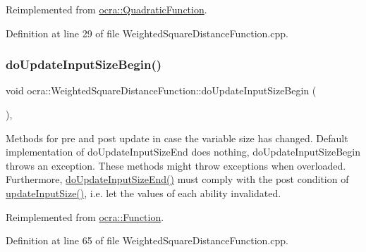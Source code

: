 Reimplemented from \hyperlink{classocra_1_1QuadraticFunction_aeaeed88d4fef66c5db465f2887320e37}{ocra\+::\+Quadratic\+Function}.



Definition at line 29 of file Weighted\+Square\+Distance\+Function.\+cpp.

\hypertarget{classocra_1_1WeightedSquareDistanceFunction_aff6adfc9daa9242233f58a8c2c16ba7d}{}\label{classocra_1_1WeightedSquareDistanceFunction_aff6adfc9daa9242233f58a8c2c16ba7d} 
\subsubsection{\texorpdfstring{do\+Update\+Input\+Size\+Begin()}{doUpdateInputSizeBegin()}}
{\footnotesize\ttfamily void ocra\+::\+Weighted\+Square\+Distance\+Function\+::do\+Update\+Input\+Size\+Begin (\begin{DoxyParamCaption}{ }\end{DoxyParamCaption})\hspace{0.3cm}{\ttfamily [protected]}, {\ttfamily [virtual]}}

Methods for pre and post update in case the variable size has changed. Default implementation of do\+Update\+Input\+Size\+End does nothing, do\+Update\+Input\+Size\+Begin throws an exception. These methods might throw exceptions when overloaded. Furthermore, {\ttfamily \hyperlink{classocra_1_1WeightedSquareDistanceFunction_ab05ab6021a40ed308b7e0d67b5a55b82}{do\+Update\+Input\+Size\+End()}} must comply with the post condition of {\ttfamily \hyperlink{classocra_1_1Function_a3a5b9e6ae296339acc87ab2cbf97ef98}{update\+Input\+Size()}}, i.\+e. let the values of each ability invalidated. 

Reimplemented from \hyperlink{classocra_1_1Function_a3f728f3758e6448aa59932853db5ddcc}{ocra\+::\+Function}.



Definition at line 65 of file Weighted\+Square\+Distance\+Function.\+cpp.

\hypertarget{classocra_1_1WeightedSquareDistanceFunction_ab05ab6021a40ed308b7e0d67b5a55b82}{}\label{classocra_1_1WeightedSquareDistanceFunction_ab05ab6021a40ed308b7e0d67b5a55b82} 

